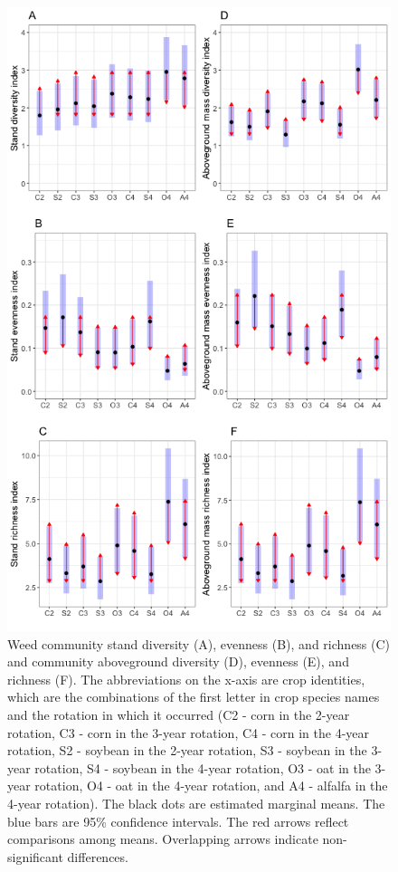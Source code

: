 \documentclass[
]{article}
\begin{document}
\begin{figure}
\centering
\includegraphics{Community_files/figure-latex/index-arrow-p-1.png}
\caption{\label{fig:index-arrow-p}Weed community stand diversity (A), evenness (B), and richness (C) and community aboveground diversity (D), evenness (E), and richness (F). The abbreviations on the x-axis are crop identities, which are the combinations of the first letter in crop species names and the rotation in which it occurred (C2 - corn in the 2-year rotation, C3 - corn in the 3-year rotation, C4 - corn in the 4-year rotation, S2 - soybean in the 2-year rotation, S3 - soybean in the 3-year rotation, S4 - soybean in the 4-year rotation, O3 - oat in the 3-year rotation, O4 - oat in the 4-year rotation, and A4 - alfalfa in the 4-year rotation). The black dots are estimated marginal means. The blue bars are 95\% confidence intervals. The red arrows reflect comparisons among means. Overlapping arrows indicate non-significant differences.}
\end{figure}
\end{document}
